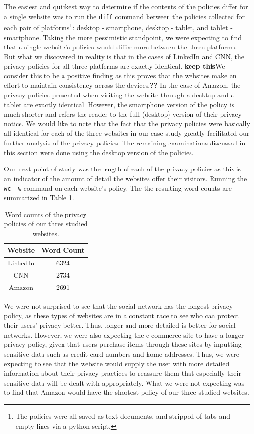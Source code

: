 \documentclass{acm_proc_article-sp}
\begin{document}
The easiest and quickest way to determine if the contents of the policies differ for a single website was to run the \texttt{diff} command between the policies collected for each pair of platforms\footnote{The policies were all saved as text documents, and stripped of tabs and empty lines via a python script.}: desktop - smartphone, desktop - tablet, and tablet - smartphone. Taking the more pessimistic standpoint, we were expecting to find that a single website's policies would differ more between the three platforms. But what we discovered in reality is that in the cases of LinkedIn and CNN, the privacy policies for all three platforms are exactly identical. \textbf{keep this}We consider this to be a positive finding as this proves that the websites make an effort to maintain consistency across the devices.\textbf{??} In the case of Amazon, the privacy policies presented when visiting the website through a desktop and a tablet are exactly identical. However, the smartphone version of the policy is much shorter and refers the reader to the full (desktop) version of their privacy notice. We would like to note that the fact that the privacy policies were basically all identical for each of the three websites in our case study greatly facilitated our further analysis of the privacy policies. The remaining examinations discussed in this section were done using the desktop version of the policies.

Our next point of study was the length of each of the privacy policies as this is an indicator of the amount of detail the websites offer their visitors. Running the \texttt{wc -w} command on each website's policy. The the resulting word counts are summarized in Table \ref{tab:wc}.

\begin{table}[htbp]
  \centering
  \caption{Word counts of the privacy policies of our three studied websites.}
    \begin{tabular}{|c|c|}
    \hline
    \textbf{Website} & \textbf{Word Count} \\    
     \hline
     LinkedIn & 6324 \\
     CNN & 2734 \\
     Amazon & 2691 \\
     \hline
    \end{tabular}%
  \label{tab:wc}%
\end{table}%

We were not surprised to see that the social network has the longest privacy policy, as these types of websites are in a constant race to see who can protect their users' privacy better. Thus, longer and more detailed is better for social networks. However, we were also expecting the e-commerce site to have a longer privacy policy, given that users purchase items through these sites by inputting sensitive data such as credit card numbers and home addresses. Thus, we were expecting to see that the website would supply the user with more detailed information about their privacy practices to reassure them that especially their sensitive data will be dealt with appropriately. What we were not expecting was to find that Amazon would have the shortest policy of our three studied websites.
\end{document}
